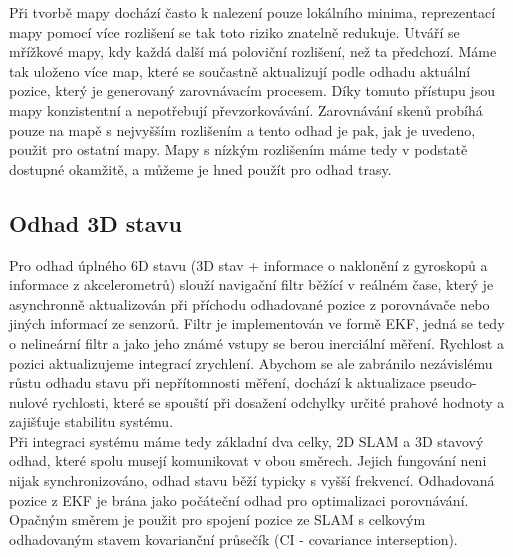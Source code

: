 \documentclass[11pt]{article}
\begin{document}
\indent Při tvorbě mapy dochází často k nalezení pouze lokálního minima, reprezentací mapy pomocí více rozlišení se tak toto riziko znatelně redukuje. Utváří se mřížkové mapy, kdy každá další má poloviční rozlišení, než ta předchozí. Máme tak uloženo více map, které se součastně aktualizují podle odhadu aktuální pozice, který je generovaný zarovnávacím procesem. Díky tomuto přístupu jsou mapy konzistentní a nepotřebují převzorkovávání. Zarovnávání skenů probíhá pouze na mapě s nejvyšším rozlišením a tento odhad je pak, jak je uvedeno, použit pro ostatní mapy. Mapy s nízkým rozlišením máme tedy v podstatě dostupné okamžitě, a můžeme je hned použít pro odhad trasy. 

\subsection{Odhad 3D stavu}
Pro odhad úplného 6D stavu (3D stav + informace o naklonění z gyroskopů a informace z akcelerometrů) slouží navigační filtr běžící v reálném čase, který je asynchronně aktualizován při příchodu odhadované pozice z porovnávače nebo jiných informací ze senzorů. Filtr je implementován ve formě EKF, jedná se tedy o nelineární filtr a jako jeho známé vstupy se berou inerciální měření. Rychlost a pozici aktualizujeme integrací zrychlení. Abychom se ale zabránilo nezávislému růstu odhadu stavu při nepřítomnosti měření, dochází k aktualizace pseudo-nulové rychlosti, které se spouští při dosažení odchylky určité prahové hodnoty a zajišťuje stabilitu systému.\\
\indent Při integraci systému máme tedy základní dva celky, 2D SLAM a 3D stavový odhad, které spolu musejí komunikovat v obou směrech. Jejich fungování neni nijak synchronizováno, odhad stavu běží typicky s vyšší frekvencí. Odhadovaná pozice z EKF je brána jako počáteční odhad pro optimalizaci porovnávání. Opačným směrem je použit pro spojení pozice ze SLAM s celkovým odhadovaným stavem kovarianční průsečík (CI - covariance interseption).
\end{document}
